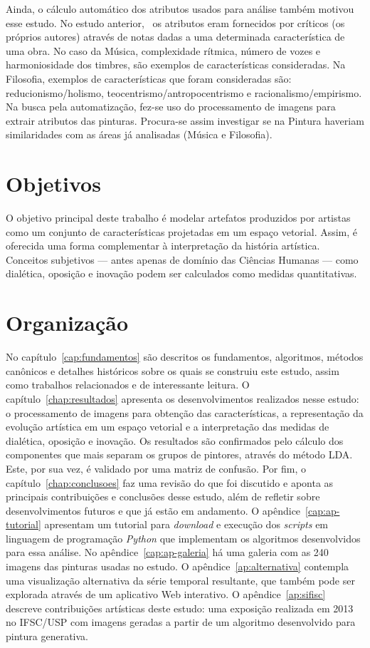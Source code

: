 Ainda, o cálculo automático dos atributos usados para análise também
motivou esse estudo. No estudo anterior,~\cite{vieira} os atributos
eram fornecidos por críticos (os próprios autores) através de notas
dadas a uma determinada característica de uma obra. No caso da Música,
complexidade rítmica, número de vozes e harmoniosidade dos timbres, são
exemplos de características consideradas. Na Filosofia, exemplos de
características que foram consideradas são: reducionismo/holismo,
teocentrismo/antropocentrismo e racionalismo/empirismo. Na busca pela
automatização, fez-se uso do processamento de imagens para extrair
atributos das pinturas. Procura-se assim investigar se na Pintura
haveriam similaridades com as áreas já analisadas (Música e
Filosofia).

\section{Objetivos}

O objetivo principal deste trabalho é modelar artefatos produzidos por
artistas como um conjunto de características projetadas em um espaço
vetorial. Assim, é oferecida uma forma complementar à interpretação da
história artística. Conceitos subjetivos --- antes apenas de domínio
das Ciências Humanas --- como dialética, oposição e inovação podem ser
calculados como medidas quantitativas.

\section{Organização}

No capítulo~\ref{cap:fundamentos} são descritos os fundamentos,
algoritmos, métodos canônicos e detalhes históricos sobre os quais se
construiu este estudo, assim como trabalhos relacionados e de
interessante leitura. O capítulo~\ref{chap:resultados} apresenta os
desenvolvimentos realizados nesse estudo: o processamento de imagens
para obtenção das características, a representação da evolução
artística em um espaço vetorial e a interpretação das medidas de
dialética, oposição e inovação. Os resultados são confirmados pelo
cálculo dos componentes que mais separam os grupos de pintores,
através do método LDA. Este, por sua vez, é validado por uma matriz de
confusão. Por fim, o capítulo~\ref{chap:conclusoes} faz uma revisão do
que foi discutido e aponta as principais contribuições e conclusões
desse estudo, além de refletir sobre desenvolvimentos futuros e que já
estão em andamento. O apêndice~\ref{cap:ap-tutorial} apresentam um tutorial
para \textit{download} e execução dos \textit{scripts} em linguagem de
programação \textit{Python} que implementam os algoritmos
desenvolvidos para essa análise. No apêndice~\ref{cap:ap-galeria} há uma galeria com as
240 imagens das pinturas usadas no estudo. O apêndice~\ref{ap:alternativa} contempla
uma visualização alternativa da série temporal resultante, que também
pode ser explorada através de um aplicativo Web interativo. O apêndice~\ref{ap:sifisc} descreve contribuições artísticas deste estudo: uma exposição
realizada em 2013 no IFSC/USP com imagens geradas a partir de um
algoritmo desenvolvido para pintura generativa.

